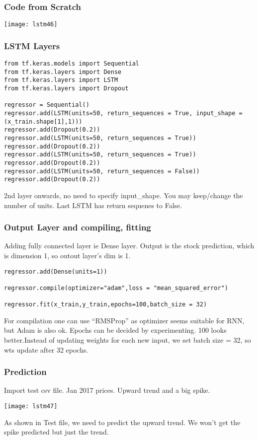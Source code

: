 \begin{frame}[fragile] \frametitle{Code from Scratch}
\begin{center}
\texttt{[image: lstm46]}
\end{center}
\end{frame}

\begin{frame}[fragile] \frametitle{LSTM Layers}

\begin{lstlisting}
from tf.keras.models import Sequential
from tf.keras.layers import Dense
from tf.keras.layers import LSTM
from tf.keras.layers import Dropout

regressor = Sequential()
regressor.add(LSTM(units=50, return_sequences = True, input_shape = (x_train.shape[1],1)))
regressor.add(Dropout(0.2))
regressor.add(LSTM(units=50, return_sequences = True))
regressor.add(Dropout(0.2))
regressor.add(LSTM(units=50, return_sequences = True))
regressor.add(Dropout(0.2))
regressor.add(LSTM(units=50, return_sequences = False))
regressor.add(Dropout(0.2))
\end{lstlisting}
2nd layer onwards, no need to specify input\_shape. You may keep/change the number of units. Last LSTM has return sequenes to False.
\end{frame}


\begin{frame}[fragile] \frametitle{Output Layer and compiling, fitting}
Adding fully connected layer ie Dense layer.
Output is the stock prediction, which is dimension 1, so outout layer's dim is 1.
\begin{lstlisting}
regressor.add(Dense(units=1))

regressor.compile(optimizer="adam",loss = "mean_squared_error")

regressor.fit(x_train,y_train,epochs=100,batch_size = 32)
\end{lstlisting}
For compilation one can use ``RMSProp'' as optimizer seems suitable for RNN, but Adam is also ok.
Epochs can be decided by experimenting. 100 looks better.Instead of updating weights for each new input, we set batch size = 32, so wts update after 32 epochs.
\end{frame}

\begin{frame}[fragile] \frametitle{Prediction}
Import test csv file.
Jan 2017 prices. Upward trend and a big spike.

\begin{center}
\texttt{[image: lstm47]}
\end{center}
As shown in Test file, we need to predict the upward trend. We won't get the spike predicted but just the trend.
\end{frame}

